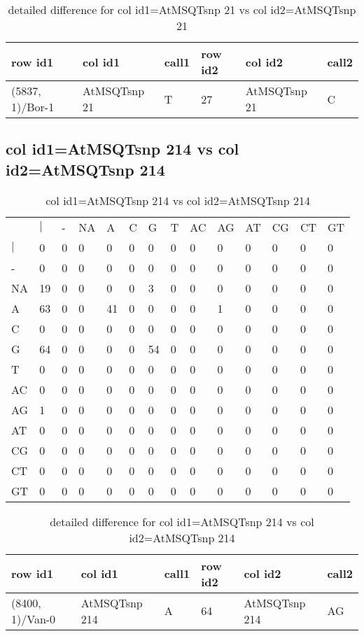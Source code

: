 \begin{center}
\begin{longtable}{|l|l|l|l|l|l|}
\caption{detailed difference for col id1=AtMSQTsnp 21 vs col id2=AtMSQTsnp 21} \label{table_dm585}\\
\hline
row id1&col id1&call1&row id2&col id2&call2\\
\hline
(5837, 1)/Bor-1&AtMSQTsnp 21&T&27&AtMSQTsnp 21&C\\
\hline
\end{longtable}
\end{center}

\subsection{col id1=AtMSQTsnp 214 vs col id2=AtMSQTsnp 214}
\begin{center}
\begin{longtable}{|l|l|l|l|l|l|l|l|l|l|l|l|l|l|}
\caption{col id1=AtMSQTsnp 214 vs col id2=AtMSQTsnp 214} \label{table_dm586}\\
\hline
\\
\hline
&$|$&-&NA&A&C&G&T&AC&AG&AT&CG&CT&GT\\
$|$&0&0&0&0&0&0&0&0&0&0&0&0&0\\
-&0&0&0&0&0&0&0&0&0&0&0&0&0\\
NA&19&0&0&0&0&3&0&0&0&0&0&0&0\\
A&63&0&0&41&0&0&0&0&1&0&0&0&0\\
C&0&0&0&0&0&0&0&0&0&0&0&0&0\\
G&64&0&0&0&0&54&0&0&0&0&0&0&0\\
T&0&0&0&0&0&0&0&0&0&0&0&0&0\\
AC&0&0&0&0&0&0&0&0&0&0&0&0&0\\
AG&1&0&0&0&0&0&0&0&0&0&0&0&0\\
AT&0&0&0&0&0&0&0&0&0&0&0&0&0\\
CG&0&0&0&0&0&0&0&0&0&0&0&0&0\\
CT&0&0&0&0&0&0&0&0&0&0&0&0&0\\
GT&0&0&0&0&0&0&0&0&0&0&0&0&0\\
\hline
\end{longtable}
\end{center}

\begin{center}
\begin{longtable}{|l|l|l|l|l|l|}
\caption{detailed difference for col id1=AtMSQTsnp 214 vs col id2=AtMSQTsnp 214} \label{table_dm587}\\
\hline
row id1&col id1&call1&row id2&col id2&call2\\
\hline
(8400, 1)/Van-0&AtMSQTsnp 214&A&64&AtMSQTsnp 214&AG\\
\hline
\end{longtable}
\end{center}

